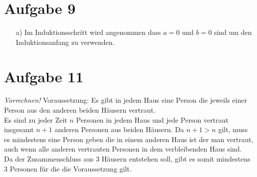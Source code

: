 \documentclass[paper = a4, ngerman]{scrartcl}
\begin{document}
\begin{itemize}
		\end{itemize}
	
	
	\section*{Aufgabe 9}
		\begin{itemize}
			\item[a)] Im Induktionsschritt wird angenommen dass $a=0$ und $b=0$ sind um den Induktionsanfang zu verwenden.
		\end{itemize}
	

\pagebreak
	\section*{Aufgabe 11}
		\textit{Vorrechnen!}
		Voraussetzung: Es gibt in jedem Haus eine Person die jeweils einer Person aus den anderen beiden Häusern vertraut.\\
		Es sind zu jeder Zeit $n$ Personen in jedem Haus und jede Person vertraut insgesamt $n+1$ anderen Personen aus beiden Häusern. Da $n+1 > n$ gilt, muss es mindestens eine Person geben die in einem anderen Haus ist der man vertraut, auch wenn alle anderen vertrauten Personen in dem verbleibenden Haus sind.\\
		Da der Zusammenschluss aus 3 Häusern entstehen soll, gibt es somit mindestens 3 Personen für die die Voraussetzung gilt.
\end{document}
